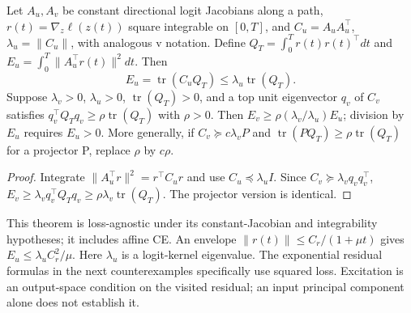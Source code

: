 \begin{theorem}
\label{thm:astra_excitation}
Let $A_u,A_v$ be constant directional logit Jacobians along a path,
$r(t)=\nabla_z\ell(z(t))$ square integrable on $[0,T]$, and
$C_u=A_uA_u^\top$, $\lambda_u=\|C_u\|$, with analogous v notation.
Define $Q_T=\int_0^T r(t)r(t)^\top dt$ and
$E_u=\int_0^T\|A_u^\top r(t)\|^2dt$. Then
\[
 E_u=\operatorname{tr}(C_uQ_T)\le\lambda_u\operatorname{tr}(Q_T).
\]
Suppose $\lambda_v>0$, $\lambda_u>0$, $\operatorname{tr}(Q_T)>0$,
and a top unit eigenvector $q_v$ of $C_v$ satisfies
$q_v^\top Q_Tq_v\ge\rho\operatorname{tr}(Q_T)$ with $\rho>0$.
Then $E_v\ge\rho(\lambda_v/\lambda_u)E_u$; division by $E_u$ requires
$E_u>0$. More generally, if $C_v\succeq c\lambda_vP$ and
$\operatorname{tr}(PQ_T)\ge\rho\operatorname{tr}(Q_T)$ for a projector P,
replace $\rho$ by $c\rho$.
\end{theorem}
\begin{proof}
Integrate $\|A_u^\top r\|^2=r^\top C_ur$ and use
$C_u\preceq\lambda_uI$. Since $C_v\succeq\lambda_vq_vq_v^\top$,
$E_v\ge\lambda_v q_v^\top Q_Tq_v\ge\rho\lambda_v\operatorname{tr}(Q_T)$.
The projector version is identical.
\end{proof}
\begin{remark}
This theorem is loss-agnostic under its constant-Jacobian and integrability
hypotheses; it includes affine CE. An envelope
$\|r(t)\|\le C_r/(1+\mu t)$ gives $E_u\le\lambda_u C_r^2/\mu$.
Here $\lambda_u$ is a logit-kernel eigenvalue. The exponential residual
formulas in the next counterexamples specifically use squared loss.
Excitation is an output-space condition on the visited residual; an
input principal component alone does not establish it.
\end{remark}

